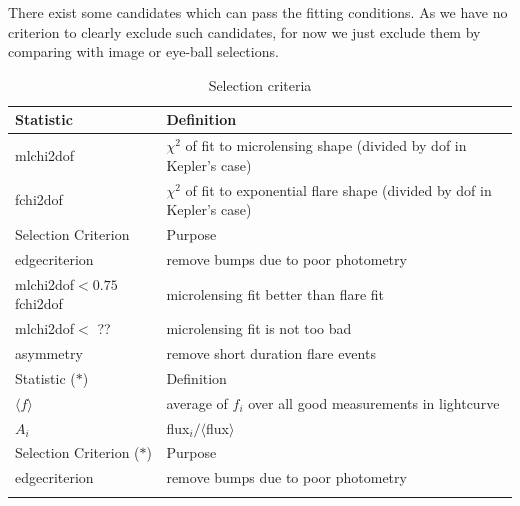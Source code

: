 \documentclass[iop, apj]{emulateapj}
\newcommand{\?}{\stackrel{?}{=}}
\begin{document}

There exist some candidates which can pass the fitting conditions. 
As we have no criterion to clearly exclude such candidates, 
for now we just exclude them by comparing with image or eye-ball selections. 



\begin{table}[t]%
\label{tab:selecond}
    \caption{Selection criteria}
    \begin{center}
   \begin{tabular}{ll}
      \hline %
   \multicolumn{1}{l}{Statistic}&\multicolumn{1}{l}{Definition}\\
 \hline 
mlchi2dof & $\chi^2$ of fit to microlensing shape (divided by dof in Kepler's case)\\
fchi2dof & $\chi^2$ of fit to exponential flare shape (divided by dof in Kepler's case)\\ 
  \hline
  \hline
   \multicolumn{1}{l}{Selection Criterion}&\multicolumn{1}{l}{Purpose}\\
 \hline 
edgecriterion & remove bumps due to poor photometry\\
mlchi2dof$<0.75$ fchi2dof & microlensing fit better than flare fit\\
mlchi2dof$<$ ?? & microlensing fit is not too bad\\
asymmetry & remove short duration flare events\\
 \hline 
 \hline 
   \multicolumn{1}{l}{Statistic ($*$)}&\multicolumn{1}{l}{Definition}\\
 \hline 
$\langle f\rangle$ & average of $f_i$ over all good measurements in lightcurve\\
$A_i$ & flux$_i / \langle$flux$\rangle$\\
 \hline 
 \hline 
   \multicolumn{1}{l}{Selection Criterion ($*$)}&\multicolumn{1}{l}{Purpose}\\
 \hline 
edgecriterion & remove bumps due to poor photometry\\
 \hline 
   \label{table:counta}
  	\end{tabular}
	   \end{center}
   \end{table}
%
\end{document}
